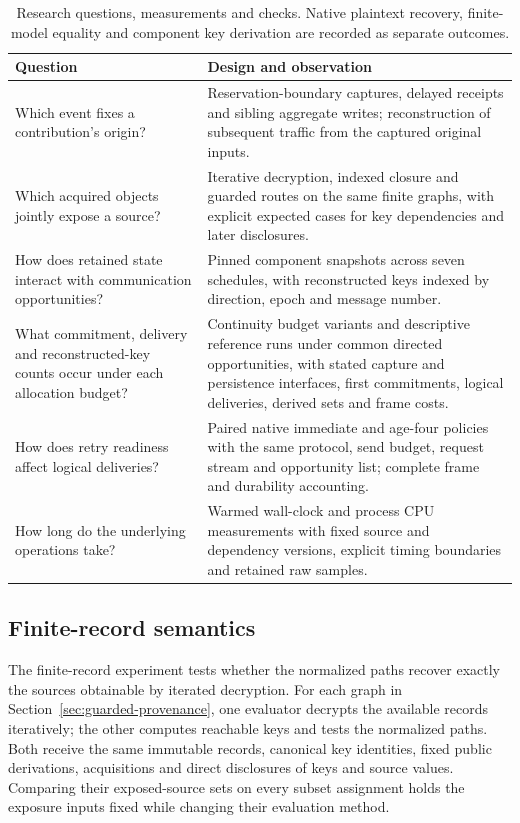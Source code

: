\begin{table}[t]
\centering
\caption{Research questions, measurements and checks. Native plaintext
recovery, finite-model equality and component key derivation are recorded as
separate outcomes.}
\label{tab:validation-questions}
\small
\begin{tabularx}{\linewidth}{@{}>{\raggedright\arraybackslash}p{.30\linewidth}X@{}}
\toprule
Question & Design and observation\\
\midrule
Which event fixes a contribution's origin? &
Reservation-boundary captures, delayed receipts and sibling aggregate writes;
reconstruction of subsequent traffic from the captured original inputs.\\
Which acquired objects jointly expose a source? &
Iterative decryption, indexed closure and guarded routes on the same finite graphs, with
explicit expected cases for key dependencies and later disclosures.\\
How does retained state interact with communication opportunities? &
Pinned component snapshots across seven schedules, with reconstructed keys
indexed by direction, epoch and message number.\\
What commitment, delivery and reconstructed-key counts occur under each allocation budget? &
Continuity budget variants and descriptive reference runs under common
directed opportunities, with stated capture and persistence interfaces,
first commitments, logical deliveries, derived sets and frame costs.\\
How does retry readiness affect logical deliveries? &
Paired native immediate and age-four policies with the same protocol, send
budget, request stream and opportunity list; complete frame and durability
accounting.\\
How long do the underlying operations take? &
Warmed wall-clock and process CPU measurements with fixed source and
dependency versions, explicit timing boundaries and retained raw samples.\\
\bottomrule
\end{tabularx}
\end{table}

\subsection{Finite-record semantics}

\label{sec:guarded-checks}

The finite-record experiment tests whether the normalized paths recover
exactly the sources obtainable by iterated decryption. For each graph
in Section~\ref{sec:guarded-provenance}, one evaluator decrypts the
available records iteratively; the other computes reachable keys and
tests the normalized paths. Both receive the same immutable records,
canonical key identities, fixed public derivations, acquisitions and
direct disclosures of keys and source values. Comparing their
exposed-source sets on every subset assignment holds the exposure inputs
fixed while changing their evaluation method.

